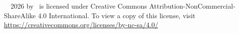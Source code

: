 \thispagestyle{empty}

\null
\vfill

\scriptTitle\ \textcopyright\ 2026 by \scriptAuthor\ is licensed under Creative Commons Attribution-NonCommercial-ShareAlike 4.0 International.
To view a copy of this license, visit \url{https://creativecommons.org/licenses/by-nc-sa/4.0/}

\cleardoublepage

